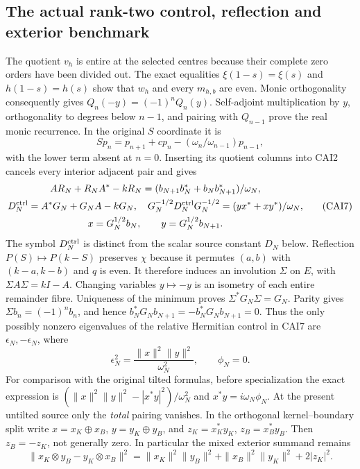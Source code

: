 \subsection{The actual rank-two control, reflection and exterior benchmark}

The quotient $v_h$ is entire at the selected centres because their
complete zero orders have been divided out. The exact equalities
$\xi(1-s)=\xi(s)$ and $h(1-s)=h(s)$ show that $w_h$ and every $m_{h,b}$
are even. Monic orthogonality consequently gives $Q_n(-y)=(-1)^nQ_n(y)$.
Self-adjoint multiplication by $y$, orthogonality to degrees below
$n-1$, and pairing with $Q_{n-1}$ prove the real monic recurrence.
In the original $S$ coordinate it is
\[
 Sp_n=p_{n+1}+cp_n-(\omega_n/\omega_{n-1})p_{n-1},\tag{CAI6}
\]
with the lower term absent at $n=0$. Inserting its quotient columns into
CAI2 cancels every interior adjacent pair and gives
\[
\begin{gathered}
 AR_N+R_NA^*-kR_N=(b_{N+1}b_N^*+b_Nb_{N+1}^*)/\omega_N,\\
 D_N^{\rm ctrl}=A^*G_N+G_NA-kG_N,\quad
 G_N^{-1/2}D_N^{\rm ctrl}G_N^{-1/2}=(yx^*+xy^*)/\omega_N,\\
 x=G_N^{1/2}b_N,\qquad y=G_N^{1/2}b_{N+1}.
\end{gathered}\tag{CAI7}
\]
The symbol $D_N^{\rm ctrl}$ is distinct from the scalar source constant
$D_N$ below. Reflection $P(S)\mapsto P(k-S)$ preserves $\chi$ because
it permutes $(a,b)$ with $(k-a,k-b)$ and $q$ is even. It therefore induces
an involution $\Sigma$ on $E$, with $\Sigma A\Sigma=kI-A$.
Changing variables $y\mapsto-y$ is an isometry of each entire remainder
fibre. Uniqueness of the minimum proves $\Sigma^*G_N\Sigma=G_N$.
Parity gives $\Sigma b_n=(-1)^nb_n$, and hence
$b_N^*G_Nb_{N+1}=-b_N^*G_Nb_{N+1}=0$. Thus the only possibly nonzero
eigenvalues of the relative Hermitian control in CAI7 are
$\epsilon_N,-\epsilon_N$, where
\[
 \epsilon_N^2=\frac{\|x\|^2\|y\|^2}{\omega_N^2},\qquad
 \phi_N=0.\tag{CAI8}
\]
For comparison with the original tilted formulas, before specialization
the exact expression is
$(\|x\|^2\|y\|^2-|x^*y|^2)/\omega_N^2$ and
$x^*y=i\omega_N\phi_N$. At the present untilted source only the
\emph{total} pairing vanishes. In the orthogonal kernel--boundary split
write $x=x_K\oplus x_B$, $y=y_K\oplus y_B$, and
$z_K=x_K^*y_K$, $z_B=x_B^*y_B$. Then $z_B=-z_K$, not generally zero.
In particular the mixed exterior summand remains
\[
 \|x_K\otimes y_B-y_K\otimes x_B\|^2
 =\|x_K\|^2\|y_B\|^2+\|x_B\|^2\|y_K\|^2+2|z_K|^2.\tag{CAI9}
\]

